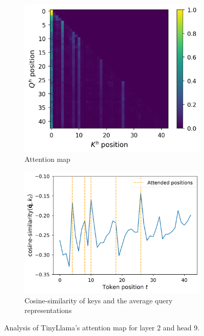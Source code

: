 \begin{figure}[!ht]
\centering
\begin{subfigure}[b]{0.45\columnwidth}
     \includegraphics[width=\linewidth]{sources/part_1/anisotropy/imgs/attn_l1h8.png}
     \caption{Attention map}
     \label{fig:amap_l1h8}
\end{subfigure}
\hfill
\begin{subfigure}[b]{0.45\columnwidth}
     \includegraphics[width=\linewidth]{sources/part_1/anisotropy/imgs/cosine_q_khat_l1h8.png}
     \caption{Cosine-similarity of keys and the average query representations}
     \label{fig:cosim_l1h8}
\end{subfigure}
\caption{Analysis of TinyLlama's attention map for layer 2 and head 9.}
\label{fig:attn_maps_l1h8}
\end{figure}

